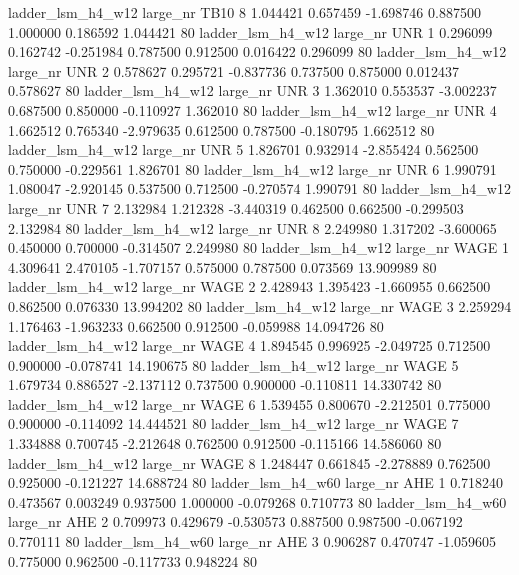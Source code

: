   ladder_lsm_h4_w12   large_nr     TB10                 8  1.044421  0.657459  -1.698746 0.887500 1.000000  0.186592    1.044421 80
  ladder_lsm_h4_w12   large_nr      UNR                 1  0.296099  0.162742  -0.251984 0.787500 0.912500  0.016422    0.296099 80
  ladder_lsm_h4_w12   large_nr      UNR                 2  0.578627  0.295721  -0.837736 0.737500 0.875000  0.012437    0.578627 80
  ladder_lsm_h4_w12   large_nr      UNR                 3  1.362010  0.553537  -3.002237 0.687500 0.850000 -0.110927    1.362010 80
  ladder_lsm_h4_w12   large_nr      UNR                 4  1.662512  0.765340  -2.979635 0.612500 0.787500 -0.180795    1.662512 80
  ladder_lsm_h4_w12   large_nr      UNR                 5  1.826701  0.932914  -2.855424 0.562500 0.750000 -0.229561    1.826701 80
  ladder_lsm_h4_w12   large_nr      UNR                 6  1.990791  1.080047  -2.920145 0.537500 0.712500 -0.270574    1.990791 80
  ladder_lsm_h4_w12   large_nr      UNR                 7  2.132984  1.212328  -3.440319 0.462500 0.662500 -0.299503    2.132984 80
  ladder_lsm_h4_w12   large_nr      UNR                 8  2.249980  1.317202  -3.600065 0.450000 0.700000 -0.314507    2.249980 80
  ladder_lsm_h4_w12   large_nr     WAGE                 1  4.309641  2.470105  -1.707157 0.575000 0.787500  0.073569   13.909989 80
  ladder_lsm_h4_w12   large_nr     WAGE                 2  2.428943  1.395423  -1.660955 0.662500 0.862500  0.076330   13.994202 80
  ladder_lsm_h4_w12   large_nr     WAGE                 3  2.259294  1.176463  -1.963233 0.662500 0.912500 -0.059988   14.094726 80
  ladder_lsm_h4_w12   large_nr     WAGE                 4  1.894545  0.996925  -2.049725 0.712500 0.900000 -0.078741   14.190675 80
  ladder_lsm_h4_w12   large_nr     WAGE                 5  1.679734  0.886527  -2.137112 0.737500 0.900000 -0.110811   14.330742 80
  ladder_lsm_h4_w12   large_nr     WAGE                 6  1.539455  0.800670  -2.212501 0.775000 0.900000 -0.114092   14.444521 80
  ladder_lsm_h4_w12   large_nr     WAGE                 7  1.334888  0.700745  -2.212648 0.762500 0.912500 -0.115166   14.586060 80
  ladder_lsm_h4_w12   large_nr     WAGE                 8  1.248447  0.661845  -2.278889 0.762500 0.925000 -0.121227   14.688724 80
  ladder_lsm_h4_w60   large_nr      AHE                 1  0.718240  0.473567   0.003249 0.937500 1.000000 -0.079268    0.710773 80
  ladder_lsm_h4_w60   large_nr      AHE                 2  0.709973  0.429679  -0.530573 0.887500 0.987500 -0.067192    0.770111 80
  ladder_lsm_h4_w60   large_nr      AHE                 3  0.906287  0.470747  -1.059605 0.775000 0.962500 -0.117733    0.948224 80
